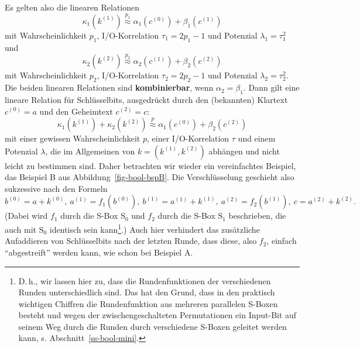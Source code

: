 \begin{refsegment}
Es gelten also die linearen Relationen
\[
   \kappa_1(k^{(1)}) \stackrel{p_1}{\approx} \alpha_1(c^{(0)}) + \beta_1(c^{(1)})
\]
mit Wahrscheinlichkeit $p_1$, I/O-Korrelation $\tau_1 = 2p_1 - 1$ und
Potenzial $\lambda_1 = \tau_1^2$ und
\[
   \kappa_2(k^{(2)}) \stackrel{p_2}{\approx} \alpha_2(c^{(1)}) + \beta_2(c^{(2)})
\]
mit Wahrscheinlichkeit $p_2$, I/O-Korrelation $\tau_2 = 2p_2 - 1$ und
Potenzial $\lambda_2 = \tau_2^2$.
Die beiden linearen Relationen sind \textbf{kombinierbar}, wenn $\alpha_2 = \beta_1$.
Dann gilt eine lineare Relation für Schlüsselbits, ausgedrückt durch
den (bekannten) Klartext $c^{(0)} = a$ und den Geheimtext $c^{(2)} = c$:
\[
   \kappa_1(k^{(1)}) + \kappa_2(k^{(2)}) \stackrel{p}{\approx}
      \alpha_1(c^{(0)}) + \beta_2(c^{(2)})
\]
mit einer gewissen Wahrscheinlichkeit $p$, einer I/O-Korrelation
$\tau$ und einem Potenzial $\lambda$,
die im Allgemeinen von $k = (k^{(1)},k^{(2)})$ abhängen und nicht leicht zu
bestimmen sind. Daher betrachten wir wieder
ein vereinfachtes Beispiel, das Beispiel B aus Abbildung~\ref{fig-bool-bspB}.
Die Verschlüsselung geschieht also sukzessive nach den Formeln
\[
   b^{(0)} = a+k^{(0)},\: a^{(1)} = f_1(b^{(0)}),\: b^{(1)} = a^{(1)}+k^{(1)},\:
   a^{(2)} = f_2(b^{(1)}),\: c = a^{(2)}+k^{(2)}.
\]
(Dabei wird $f_1$ durch die S-Box $\mathrm{S}_0$ und $f_2$ durch die S-Box
$\mathrm{S}_1$ beschrieben, die auch mit $\mathrm{S}_0$ identisch sein
kann\footnote{%
   D.\,h., wir lassen hier zu, dass die Rundenfunktionen der verschiedenen
   Runden unterschiedlich sind. Das hat den Grund, dass in den praktisch
   wichtigen Chiffren die Rundenfunktion aus mehreren parallelen S-Boxen
   besteht und wegen der zwischengeschalteten Permutationen ein Input-Bit
   auf seinem Weg durch die Runden durch verschiedene S-Boxen geleitet
   werden kann, s. Abschnitt~\ref{ss-bool-mini}.
}.) Auch hier verhindert das zusätzliche Aufaddieren
von Schlüsselbits nach der letzten Runde, dass diese, also $f_2$, einfach
"`abgestreift"' werden kann, wie schon bei Beispiel A.


\end{refsegment}

